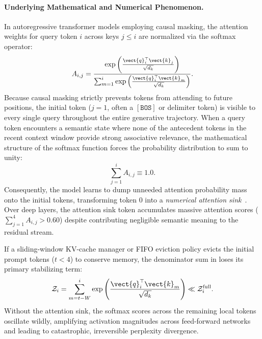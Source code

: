 \paragraph{Underlying Mathematical and Numerical Phenomenon.}
In autoregressive transformer models employing causal masking, the attention weights for query token $i$ across keys $j \le i$ are normalized via the softmax operator:
\begin{equation}
A_{i,j} = \frac{\exp\left(\frac{\vect{q}_i^\top \vect{k}_j}{\sqrt{d_k}}\right)}{\sum_{m=1}^i \exp\left(\frac{\vect{q}_i^\top \vect{k}_m}{\sqrt{d_k}}\right)}.
\end{equation}
Because causal masking strictly prevents tokens from attending to future positions, the initial token ($j=1$, often a $\mathtt{[BOS]}$ or delimiter token) is visible to every single query throughout the entire generative trajectory. When a query token encounters a semantic state where none of the antecedent tokens in the recent context window provide strong associative relevance, the mathematical structure of the softmax function forces the probability distribution to sum to unity:
\begin{equation}
\sum_{j=1}^i A_{i,j} \equiv 1.0.
\end{equation}
Consequently, the model learns to dump unneeded attention probability mass onto the initial tokens, transforming token 0 into a \emph{numerical attention sink}~\cite{xiao2024streamingllm}. Over deep layers, the attention sink token accumulates massive attention scores ($\sum_{j=1}^4 A_{i,j} > 0.60$) despite contributing negligible semantic meaning to the residual stream.

If a sliding-window KV-cache manager or FIFO eviction policy evicts the initial prompt tokens ($t < 4$) to conserve memory, the denominator sum in  loses its primary stabilizing term:
\begin{equation}
\mathcal{Z}_i = \sum_{m=t - W}^i \exp\left(\frac{\vect{q}_i^\top \vect{k}_m}{\sqrt{d_k}}\right) \ll \mathcal{Z}_i^{\text{full}}.
\end{equation}
Without the attention sink, the softmax scores across the remaining local tokens oscillate wildly, amplifying activation magnitudes across feed-forward networks and leading to catastrophic, irreversible perplexity divergence.

